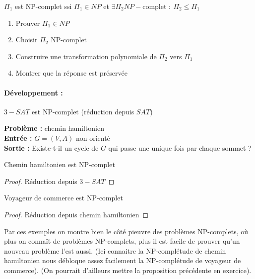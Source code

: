 \begin{proposition}
	$\Pi_1$ est NP-complet ssi $\Pi_1 \in NP$ et $\exists \Pi_2 NP-$complet $: \: \Pi_2 \leq \Pi_1$
\end{proposition}

\begin{personalise}
	\begin{enumerate}
		\item Prouver $\Pi_1 \in NP$
		\item Choisir $\Pi_2$ NP-complet
		\item Construire une transformation polynomiale de $\Pi_2$ vers $\Pi_1$
		\item Montrer que la réponse est préservée
	\end{enumerate}
\end{personalise}

\paragraph{Développement :} $3-SAT$ est NP-complet (réduction depuis $SAT$)

\begin{example}
	\textbf{Problème :} chemin hamiltonien\\
	\textbf{Entrée :} $G = (V, A)$ non orienté\\
	\textbf{Sortie :} Existe-t-il un cycle de $G$ qui passe une unique fois par chaque sommet ?
\end{example}

\begin{proposition}
	Chemin hamiltonien est NP-complet
\end{proposition}

\begin{proof}
	Réduction depuis $3-SAT$
\end{proof}

\begin{proposition}
	Voyageur de commerce est NP-complet
\end{proposition}
\begin{proof}
	Réduction depuis chemin hamiltonien
\end{proof}

\begin{com}
	Par ces exemples on montre bien le côté pieuvre des problèmes NP-complets, où plus on connaît de problèmes NP-complets, plus il est facile de prouver qu'un nouveau problème l'est aussi. (Ici connaitre la NP-complétude de chemin hamiltonien nous débloque assez facilement la NP-complétude de voyageur de commerce). (On pourrait d'ailleurs mettre la proposition précédente en exercice).
\end{com}

